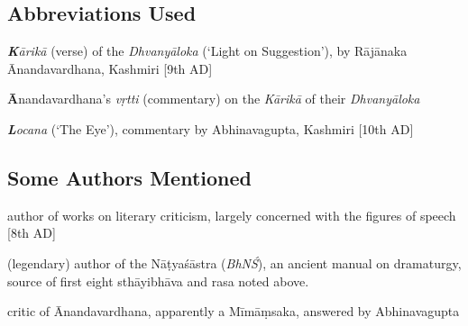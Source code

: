 \documentclass[12pt]{article}
\begin{document}
{	%
}


\subsection{Abbreviations Used}

\begin{description}
	\setlength{\itemsep}{-0.25em}

	\item[K] \textit{\textbf{K}ārikā} (verse) of the \textit{Dhvanyāloka} (`Light on Suggestion'),
	      by Rājānaka \\ Ānandavardhana, Kashmiri [9th AD]%

	\item[A] \textbf{Ā}nandavardhana's \textit{vṛtti} (commentary) on the \textit{Kārikā} of their \textit{Dhvanyāloka}

	\item[L] \textit{\textbf{L}ocana} (`The Eye'), commentary by Abhinavagupta, Kashmiri [10th AD]
\end{description}


\subsection{Some Authors Mentioned}

\begin{description}
	\setlength{\itemsep}{-0.25em}

	\item[Bhāmaha] author of works on literary criticism, largely concerned with the figures of speech [8th AD]

	\item[Bharata] (legendary) author of the Nāṭyaśāstra (\textit{BhNŚ}), an ancient manual on dramaturgy, source of first eight sthāyibhāva and rasa noted above.

	\item[Bhattanayaka] critic of Ānandavardhana, apparently a Mīmāṃsaka, answered by Abhinavagupta
\end{description}
\end{document}

